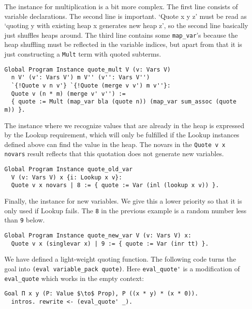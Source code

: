 \documentclass[a4paper,10pt,runningheads]{llncs}
\begin{document}
The instance for multiplication is a bit more complex. The first line consists of
 variable declarations. The second line is important. `Quote x y z' must be read as
 `quoting y with existing heap x generates new heap z', so the second line basically just
shuffles heaps around.
 The third line contains some \lstinline|map_var|'s because the heap shuffling must be
reflected in the variable indices, but apart from that it is just constructing a \lstinline|Mult| term with
quoted subterms.

\begin{lstlisting}
Global Program Instance quote_mult V (v: Vars V)
  n V' (v': Vars V') m V'' (v'': Vars V'')
  `{!Quote v n v'} `{!Quote (merge v v') m v''}:
  Quote v (n * m) (merge v' v'') :=
  { quote := Mult (map_var bla (quote n)) (map_var sum_assoc (quote m)) }.
\end{lstlisting}

The instance where we recognize values that are already in the heap is expressed by the Lookup requirement, which will only be fulfilled if the Lookup instances defined above can find the value in the heap. The novars in the \lstinline|Quote v x novars| result
   reflects that this quotation does not generate new variables.

\begin{lstlisting}
Global Program Instance quote_old_var
  V (v: Vars V) x {i: Lookup x v}:
  Quote v x novars | 8 := { quote := Var (inl (lookup x v)) }.
\end{lstlisting}


\noindent Finally, the instance for new variables. We give this a lower priority so that it is only
used if Lookup fails. The \lstinline|8| in the previous example is a random number less than \lstinline|9| below. 

\begin{lstlisting}
Global Program Instance quote_new_var V (v: Vars V) x:
  Quote v x (singlevar x) | 9 := { quote := Var (inr tt) }.
\end{lstlisting}


We have defined a light-weight quoting function. The following code turns the goal into \lstinline|(eval variable_pack quote)|.
Here \lstinline|eval_quote'| is a modification of \lstinline|eval_quote| which works in the empty context:
\begin{lstlisting}
Goal Π x y (P: Value $\to$ Prop), P ((x * y) * (x * 0)).
  intros. rewrite <- (eval_quote' _).
\end{lstlisting}
\end{document}
